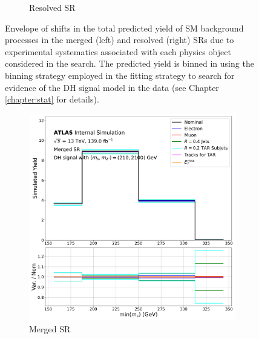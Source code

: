 \begin{figure}[htbp]
\begin{subfigure}[t]{0.48\textwidth}
     \caption{Resolved SR}
    \end{subfigure}
    \caption{Envelope of shifts in the total predicted yield of SM background processes in the merged (left) and resolved (right) SRs due to experimental systematics associated with each physics object considered in the search. The predicted yield is binned in \minms using the binning strategy employed in the fitting strategy to search for evidence of the DH signal model in the data (see Chapter \ref{chapter:stat} for details). }
   \label{fig:exp_syst_shifts_bkg}
\end{figure}

\begin{figure}[htbp]
  \centering
    \begin{subfigure}[t]{0.48\textwidth}
    \centering
     \includegraphics[width = 0.99\textwidth]{Figures/6/exp_systs_monoSWWsemilep_zp2100_dm200_dh210_SR_mgd_TARJets10_minmS_mgd.pdf}
    \caption{Merged SR}
    \end{subfigure}
    \begin{subfigure}[t]{0.48\textwidth}
    \centering

\end{subfigure}
\end{figure}
